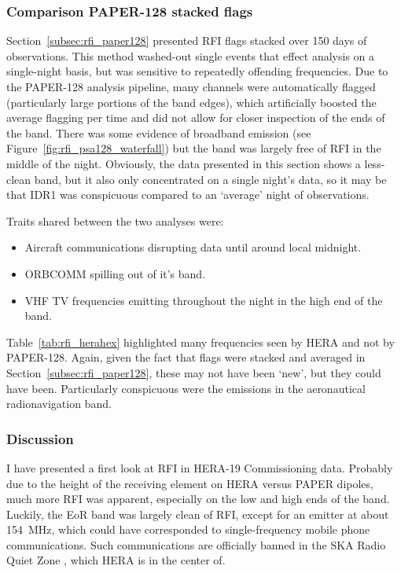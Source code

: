 \subsubsection{Comparison PAPER-128 stacked flags}
Section~\ref{subsec:rfi_paper128} presented RFI flags stacked over 150 days of observations. This method washed-out single events that effect analysis on a single-night basis, but was sensitive to repeatedly offending frequencies. Due to the PAPER-128 analysis pipeline, many channels were automatically flagged (particularly large portions of the band edges), which artificially boosted the average flagging per time and did not allow for closer inspection of the ends of the band. There was some evidence of broadband emission (see Figure~\ref{fig:rfi_psa128_waterfall}) but the band was largely free of RFI in the middle of the night. Obviously, the data presented in this section shows a less-clean band, but it also only concentrated on a single night's data, so it may be that IDR1 was conspicuous compared to an `average' night of observations.

Traits shared between the two analyses were:
\begin{itemize}
\item Aircraft communications disrupting data until around local midnight.
\item ORBCOMM spilling out of it's band.
\item VHF TV frequencies emitting throughout the night in the high end of the band.
\end{itemize} 

Table~\ref{tab:rfi_herahex} highlighted many frequencies seen by HERA and not by PAPER-128. Again, given the fact that flags were stacked and averaged in Section~\ref{subsec:rfi_paper128}, these may not have been `new', but they could have been. Particularly conspicuous were the emissions in the aeronautical radionavigation band.

\subsubsection{Discussion}
\label{subsubsec:rfi_herapaper_conc}

I have presented a first look at RFI in HERA-19 Commissioning data. Probably due to the height of the receiving element on HERA versus PAPER dipoles, much more RFI was apparent, especially on the low and high ends of the band. Luckily, the EoR band was largely clean of RFI, except for an emitter at about 154~MHz, which could have corresponded to single-frequency mobile phone communications. Such communications are officially banned in the SKA Radio Quiet Zone \citep{SAKRQZ}, which HERA is in the center of.

